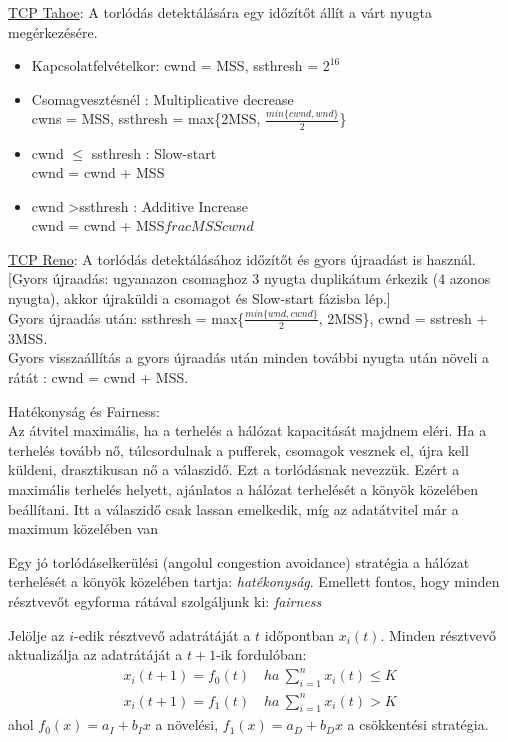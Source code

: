 \documentclass[margin=0px]{article}
\begin{document}
\begin{description}
\begin{itemize}
                  \underline{TCP Tahoe}: A torlódás detektálására egy időzítőt állít a várt nyugta megérkezésére.
                  \begin{itemize}
                      \item Kapcsolatfelvételkor: cwnd = MSS, ssthresh = $2^{16}$
                      \item Csomagvesztésnél : Multiplicative decrease \\
                            cwns = MSS, ssthresh = 	max\{2MSS, $\frac{min\{cwnd, wnd\}}{2}$\}
                      \item cwnd $\leq $ ssthresh : Slow-start \\
                            cwnd = cwnd + MSS
                      \item cwnd \textgreater ssthresh : Additive Increase \\
                            cwnd = 	cwnd + MSS$frac{MSS}{cwnd}$
                  \end{itemize}
                  \underline{TCP Reno}: A torlódás detektálásához időzítőt és gyors újraadást is használ. [Gyors újraadás: ugyanazon csomaghoz 3 nyugta duplikátum érkezik (4 azonos nyugta), akkor újraküldi a csomagot és Slow-start fázisba lép.] \\
                  Gyors újraadás után: ssthresh = max\{$\frac{min\{wnd,cwnd\}}{2}$, 2MSS\}, cwnd = sstresh + 3MSS. \\
                  Gyors visszaállítás a gyors újraadás után minden további nyugta után növeli a rátát : cwnd = cwnd + MSS.
        \end{itemize}

        Hatékonyság és Fairness: \\
        Az átvitel maximális, ha a terhelés a hálózat kapacitását majdnem eléri. Ha a terhelés tovább nő, túlcsordulnak a pufferek, csomagok vesznek el, újra kell küldeni, drasztikusan nő a válaszidő. Ezt a torlódásnak nevezzük. Ezért a maximális terhelés helyett, ajánlatos a hálózat terhelését a könyök közelében beállítani. Itt a válaszidő csak lassan emelkedik, míg az adatátvitel már a maximum közelében van

        Egy jó torlódáselkerülési (angolul congestion avoidance) stratégia a hálózat terhelését a könyök közelében tartja: \textit{hatékonyság}. Emellett fontos, hogy minden résztvevőt egyforma rátával szolgáljunk ki: \textit{fairness}

        Jelölje az $i$-edik résztvevő adatrátáját a $t$ időpontban $x_i(t)$.
        Minden résztvevő aktualizálja az adatrátáját a $t+1$-ik fordulóban:
        \begin{align*}
            x_i(t+1) = f_0(t) \quad  ha \ \sum_{i=1}^{n}x_i(t) \leq K \\
            x_i(t+1) = f_1(t) \quad  ha \ \sum_{i=1}^{n}x_i(t) > K
        \end{align*}
        ahol $f_0(x) = a_I + b_Ix$ a növelési, $f_1(x) = a_D + b_Dx$ a csökkentési stratégia.


\end{description}
\end{document}
